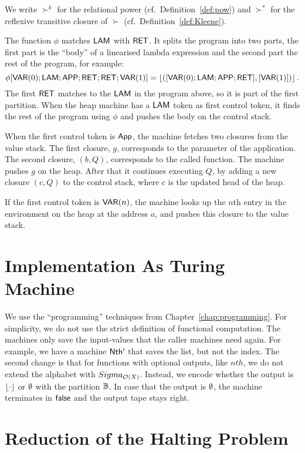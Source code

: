 We write $\succ^k$ for the relational power (cf.\ Definition~\ref{def:pow}) and $\succ^*$ for the reflexive transitive closure of $\succ$ (cf.\
Definition~\ref{def:Kleene}).

The function $\phi$ matches $\mathsf{LAM}$ with $\mathsf{RET}$.  It splits the program into two parts, the first part is the ``body'' of a linearised lambda
expression and the second part the rest of the program, for example:%
{\small
  \[
    \phi[\mathsf{VAR}(0); \mathsf{LAM}; \mathsf{APP}; \mathsf{RET}; \mathsf{RET}; \mathsf{VAR}(1)] = \left\lfloor {([\ensuremath{\mathsf{VAR}}(0); \ensuremath{\mathsf{LAM}}; \ensuremath{\mathsf{APP}}; \ensuremath{\mathsf{RET}}], [\ensuremath{\mathsf{VAR}}(1)])} \right\rfloor.
  \]
}%
The first $\mathsf{RET}$ matches to the $\mathsf{LAM}$ in the program above, so it is part of the first partition.  When the heap machine has a $\mathsf{LAM}$
token as first control token, it finds the rest of the program using $\phi$ and pushes the body on the control stack.

When the first control token is $\mathsf{App}$, the machine fetches two closures from the value stack.  The first closure, $g$, corresponds to the
parameter of the application.  The second closure, $(b,Q)$, corresponds to the called function.  The machine pushes $g$ on the heap.  After that it
continues executing $Q$, by adding a new closure $(c,Q)$ to the control stack, where $c$ is the updated head of the heap.

If the first control token is $\mathsf{VAR}(n)$, the machine looks up the $n$th entry in the environment on the heap at the address $a$, and pushes this
closure to the value stack.


\section{Implementation As Turing Machine}
\label{sec:heap-implementation}

We use the ``programming'' techniques from Chapter~\ref{chap:programming}.  For simplicity, we do not use the strict definition of functional
computation.  The machines only save the input-values that the caller machines need again.  For example, we have a machine $\mathsf{Nth'}$ that saves the
list, but not the index.  The second change is that for functions with optional outputs, like $nth$, we do not extend the alphabet with
$Sigma_{\mathcal{O}(X)}$.  Instead, we encode whether the output is $\left\lfloor {\cdot} \right\rfloor$ or $\emptyset$ with the partition $\mathbb{B}$.  In case that the output is
$\emptyset$, the machine terminates in $\mathsf{false}$ and the output tape stays right.




\section{Reduction of the Halting Problem}
\label{sec:halting-problem}




